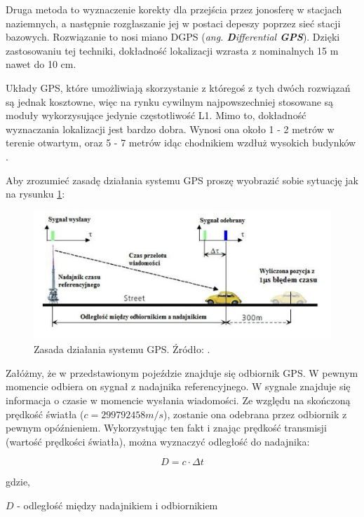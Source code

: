 Druga metoda to wyznaczenie korekty dla przejścia przez jonosferę w stacjach naziemnych, a następnie rozgłaszanie jej w postaci depeszy poprzez sieć stacji bazowych. Rozwiązanie to nosi miano DGPS (\textit{ang. \textbf{D}ifferential \textbf{GPS}}). Dzięki zastosowaniu tej techniki, dokładność lokalizacji wzrasta z nominalnych 15 m nawet do 10 cm.

Układy GPS, które umożliwiają skorzystanie z któregoś z tych dwóch rozwiązań są jednak kosztowne, więc na rynku cywilnym najpowszechniej stosowane są moduły wykorzysujące jedynie częstotliwość L1. Mimo to, dokładność wyznaczania lokalizacji jest bardzo dobra. Wynosi ona około 1 - 2 metrów w terenie otwartym, oraz 5 - 7 metrów idąc chodnikiem wzdłuż wysokich budynków \cite{inzynierka}.

Aby zrozumieć zasadę działania systemu GPS proszę wyobrazić sobie sytuację jak na rysunku \ref{fig:image_gps_basics1}:

\begin{figure}[H]
	\centering
	\includegraphics[width=12cm]{img/theory/GPS/gps_basics1.png}
	\caption{Zasada działania systemu GPS. Źródło: \cite{inzynierka}.}
	\label{fig:image_gps_basics1}
\end{figure}

Załóżmy, że w przedstawionym pojeździe znajduje się odbiornik GPS. W pewnym momencie odbiera on sygnał z nadajnika referencyjnego. W sygnale znajduje się informacja o czasie w momencie wysłania wiadomości. Ze względu na skończoną prędkość światła ($c = 299 792 458 m/s$), zostanie ona odebrana przez odbiornik z pewnym opóźnieniem. Wykorzystując ten fakt i znając prędkość transmisji (wartość prędkości światła), można wyznaczyć odległość do nadajnika:

\begin{equation}
	D = c \cdot \Delta t
\end{equation}

gdzie,

$D$ - odległość między nadajnikiem i odbiornikiem

